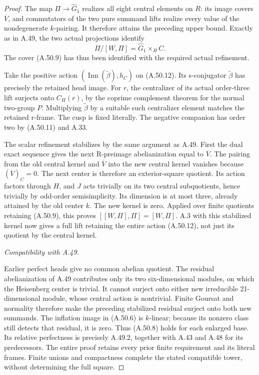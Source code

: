 \begin{proof}
The map \(\Pi\to\widehat G_1\) realizes
all eight central elements on \(R\): its
image covers \(\overline V\), and commutators
of the two pure summand lifts realize every
value of the nondegenerate \(k\)-pairing.
It therefore attains the preceding upper
bound. Exactly as in A.49, the two actual
projections identify
\[
                    \Pi/[W,\Pi]
                         =\widehat G_1\times_H C.
 \tag{A.50.12}
\]
The cover (A.50.9) has thus been identified
with the required actual refinement.

Take the positive action
\((\operatorname{Inn}(\widetilde\beta),h_C)\)
on (A.50.12). Its s-conjugator
\(\widetilde\beta\) has precisely the
retained head image. For \(r\), the
centralizer of its actual order-three lift
surjects onto \(C_H(r)\), by the coprime
complement theorem for the normal two-group
\(P\). Multiplying \(\widetilde\beta\)
by a suitable such centralizer element
matches the retained r-frame. The cusp is
fixed literally. The negative companion
has order two by (A.50.11) and A.33.

The scalar refinement stabilizes by the
same argument as A.49. First the dual exact
sequence gives the next R-preimage
abelianization equal to \(\overline V\).
The pairing from the old central kernel
and \(\overline V\) into the new central
kernel vanishes because
\((\overline V)_C=0\). The next center is
therefore an exterior-square quotient.
Its action factors through \(H\), and
\(J\) acts trivially on its two central
subquotients, hence trivially by odd-order
semisimplicity. Its dimension is at most
three, already attained by the old center
\(k\). The new kernel is zero. Applied over
finite quotients retaining (A.50.9), this
proves \([[W,\Pi],\Pi]=[W,\Pi]\).
A.3 with this stabilized kernel now gives
a full lift retaining the entire action
(A.50.12), not just its quotient by the
central kernel.

\emph{Compatibility with A.49.}\par
Earlier perfect heads give no common
abelian quotient. The residual abelianization
of A.49 contributes only its two
six-dimensional modules, on which the
Heisenberg center is trivial. It cannot
surject onto either new irreducible
21-dimensional module, whose central action
is nontrivial. Finite Goursat and normality
therefore make the preceding stabilized
residual surject onto both new summands.
The inflation image in (A.50.6) is
\(k\)-linear; because its nonzero class
still detects that residual, it is zero.
Thus (A.50.8) holds for each enlarged base.
Its relative perfectness is precisely
A.49.2, together with A.43 and A.48 for
its predecessors. The entire proof retains
every prior finite requirement and its
literal frames. Finite unions and compactness
complete the stated compatible tower,
without determining the full square.
\end{proof}

